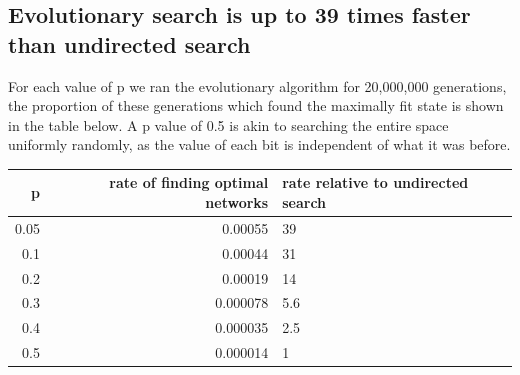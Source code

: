 \documentclass[a4paper,11pt]{article}
\begin{document}


\subsection{Evolutionary search is up to 39 times faster than undirected search}

For each value of p we ran the evolutionary algorithm for 20,000,000 generations, the proportion of these generations which found the maximally fit state is shown in the table below. A p value of 0.5 is akin to searching the entire space uniformly randomly, as the value of each bit is independent of what it was before.\par
\vspace{2em}
\begin{center}
  \begin{tabular}{| r | r | l |} 
    \hline
    p & rate of finding optimal networks & rate relative to undirected search\\ 
    \hline  
    0.05 & 0.00055 & 39\\
    0.1 & 0.00044 & 31\\
    0.2 & 0.00019 & 14 \\
    0.3 & 0.000078 & 5.6 \\
    0.4 & 0.000035 & 2.5\\
    0.5 & 0.000014 & 1\\
    \hline
  \end{tabular}
\end{center}
\vspace{2em}
\end{document}
